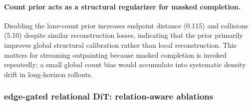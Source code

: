 \documentclass{article}
\newcommand{\EdgeDiT}{edge-gated relational DiT}
\theoremstyle{plain}
\theoremstyle{definition}
\theoremstyle{remark}
\begin{document}
\paragraph{Count prior acts as a structural regularizer for masked completion.}
Disabling the lane-count prior increases endpoint distance (0.115) and collisions (5.10) despite similar reconstruction losses,
indicating that the prior primarily improves global structural calibration rather than local reconstruction.
This matters for streaming outpainting because masked completion is invoked repeatedly; a small global count bias would accumulate into systematic density drift in long-horizon rollouts.

\subsubsection{\EdgeDiT: relation-aware ablations}
\label{app:extraexp:dit}
\end{document}
